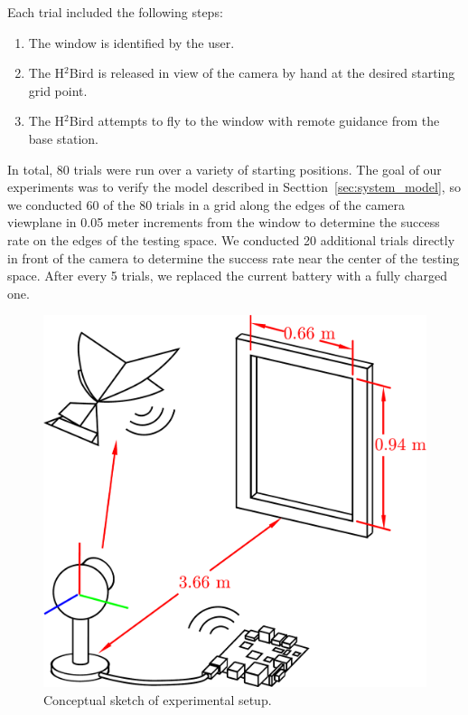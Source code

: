 \documentclass{aamas2013}
\begin{document}
Each trial included the following steps:
\begin{enumerate}
\item The window is identified by the user. 
\item The H$^2$Bird is released in view of the camera by hand at the desired starting grid point.
\item The H$^2$Bird attempts to fly to the window with remote guidance from
the base station.
\end{enumerate}

In total, 80 trials were run over a variety of starting positions. The goal of
our experiments was to verify the model described in
Secttion~\ref{sec:system_model}, so we conducted 60 of the 80 trials in a grid
along the edges of the camera viewplane in 0.05 meter increments from the
window to determine the success rate on the edges of the testing space. We
conducted 20 additional trials directly in front of the camera to determine
the success rate near the center of the testing space. After every 5 trials,
we replaced the current battery with a fully charged one.

\begin{figure}[tb]
\centering
\includegraphics[width=\linewidth]{figures/experiment_cartoon.pdf}
\caption{Conceptual sketch of experimental setup.}
\label{fig:experiment_cartoon}
\end{figure}
\end{document}
